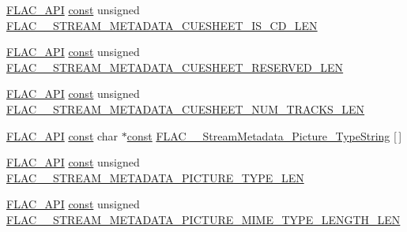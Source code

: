 \begin{DoxyCompactItemize}
\item 
\hyperlink{group__flac__export_ga56ca07df8a23310707732b1c0007d6f5}{F\+L\+A\+C\+\_\+\+A\+PI} \hyperlink{getopt1_8c_a2c212835823e3c54a8ab6d95c652660e}{const} unsigned \hyperlink{group__flac__format_gacbd3c003cb8dd36e184b57257152cd16}{F\+L\+A\+C\+\_\+\+\_\+\+S\+T\+R\+E\+A\+M\+\_\+\+M\+E\+T\+A\+D\+A\+T\+A\+\_\+\+C\+U\+E\+S\+H\+E\+E\+T\+\_\+\+I\+S\+\_\+\+C\+D\+\_\+\+L\+EN}
\item 
\hyperlink{group__flac__export_ga56ca07df8a23310707732b1c0007d6f5}{F\+L\+A\+C\+\_\+\+A\+PI} \hyperlink{getopt1_8c_a2c212835823e3c54a8ab6d95c652660e}{const} unsigned \hyperlink{group__flac__format_ga7f301f901b430c3acb334809f4641ded}{F\+L\+A\+C\+\_\+\+\_\+\+S\+T\+R\+E\+A\+M\+\_\+\+M\+E\+T\+A\+D\+A\+T\+A\+\_\+\+C\+U\+E\+S\+H\+E\+E\+T\+\_\+\+R\+E\+S\+E\+R\+V\+E\+D\+\_\+\+L\+EN}
\item 
\hyperlink{group__flac__export_ga56ca07df8a23310707732b1c0007d6f5}{F\+L\+A\+C\+\_\+\+A\+PI} \hyperlink{getopt1_8c_a2c212835823e3c54a8ab6d95c652660e}{const} unsigned \hyperlink{group__flac__format_gac45ce3823397c3c2a5c56e86fc121e0f}{F\+L\+A\+C\+\_\+\+\_\+\+S\+T\+R\+E\+A\+M\+\_\+\+M\+E\+T\+A\+D\+A\+T\+A\+\_\+\+C\+U\+E\+S\+H\+E\+E\+T\+\_\+\+N\+U\+M\+\_\+\+T\+R\+A\+C\+K\+S\+\_\+\+L\+EN}
\item 
\hyperlink{group__flac__export_ga56ca07df8a23310707732b1c0007d6f5}{F\+L\+A\+C\+\_\+\+A\+PI} \hyperlink{getopt1_8c_a2c212835823e3c54a8ab6d95c652660e}{const} char $\ast$\hyperlink{getopt1_8c_a2c212835823e3c54a8ab6d95c652660e}{const} \hyperlink{group__flac__format_gaddee484e4ef594f23402072a950e00fd}{F\+L\+A\+C\+\_\+\+\_\+\+Stream\+Metadata\+\_\+\+Picture\+\_\+\+Type\+String} \mbox{[}$\,$\mbox{]}
\item 
\hyperlink{group__flac__export_ga56ca07df8a23310707732b1c0007d6f5}{F\+L\+A\+C\+\_\+\+A\+PI} \hyperlink{getopt1_8c_a2c212835823e3c54a8ab6d95c652660e}{const} unsigned \hyperlink{group__flac__format_ga6afbd9c5fe1936bd73fd75768419414e}{F\+L\+A\+C\+\_\+\+\_\+\+S\+T\+R\+E\+A\+M\+\_\+\+M\+E\+T\+A\+D\+A\+T\+A\+\_\+\+P\+I\+C\+T\+U\+R\+E\+\_\+\+T\+Y\+P\+E\+\_\+\+L\+EN}
\item 
\hyperlink{group__flac__export_ga56ca07df8a23310707732b1c0007d6f5}{F\+L\+A\+C\+\_\+\+A\+PI} \hyperlink{getopt1_8c_a2c212835823e3c54a8ab6d95c652660e}{const} unsigned \hyperlink{group__flac__format_gadcaf6e90f8457929c7fa447d19c2b214}{F\+L\+A\+C\+\_\+\+\_\+\+S\+T\+R\+E\+A\+M\+\_\+\+M\+E\+T\+A\+D\+A\+T\+A\+\_\+\+P\+I\+C\+T\+U\+R\+E\+\_\+\+M\+I\+M\+E\+\_\+\+T\+Y\+P\+E\+\_\+\+L\+E\+N\+G\+T\+H\+\_\+\+L\+EN}
\item 

\end{DoxyCompactItemize}
